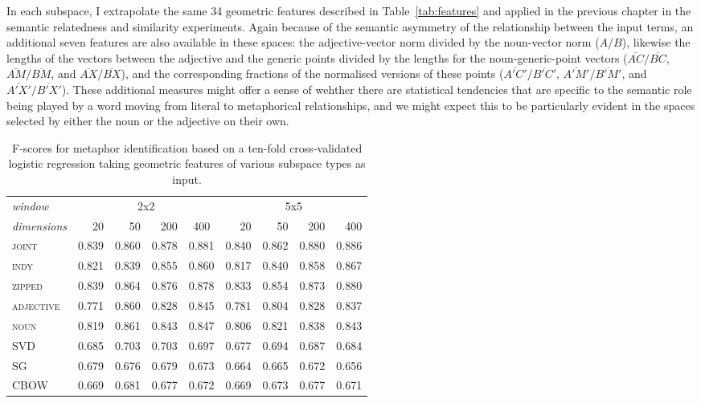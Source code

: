 In each subspace, I extrapolate the same 34 geometric features described in Table~\ref{tab:features} and applied in the previous chapter in the semantic relatedness and similarity experiments.  Again because of the semantic asymmetry of the relationship between the input terms, an additional seven features are also available in these spaces: the adjective-vector norm divided by the noun-vector norm ($A/B$), likewise the lengths of the vectors between the adjective and the generic points divided by the lengths for the noun-generic-point vectors ($\overline{AC}/\overline{BC}$, $\overline{AM}/\overline{BM}$, and $\overline{AX}/\overline{BX}$), and the corresponding fractions of the normalised versions of these points ($\overline{A'C'}/\overline{B'C'}$, $\overline{A'M'}/\overline{B'M'}$, and $\overline{A'X'}/\overline{B'X'}$).  These additional measures might offer a sense of wehther there are statistical tendencies that are specific to the semantic role being played by a word moving from literal to metaphorical relationships, and we might expect this to be particularly evident in the spaces selected by either the noun or the adjective on their own.

\begin{table}
\centering
\begin{tabular}{lrrrr|rrrr}
\hline
\emph{window} & \multicolumn{4}{c}{2x2} & \multicolumn{4}{c}{5x5} \\
\emph{dimensions} & 20 & 50 & 200 & \multicolumn{1}{c}{400} & 20 & 50 & 200 & 400 \\
\hline
\textsc{joint} & 0.839 & 0.860 & 0.878 & 0.881 & 0.840 & 0.862 & 0.880 & 0.886 \\
\textsc{indy} & 0.821 & 0.839 & 0.855 & 0.860 & 0.817 & 0.840 & 0.858 & 0.867 \\
\textsc{zipped} & 0.839 & 0.864 & 0.876 & 0.878 & 0.833 & 0.854 & 0.873 & 0.880 \\
\textsc{adjective} & 0.771 & 0.860 & 0.828 & 0.845 & 0.781 & 0.804 & 0.828 & 0.837 \\
\textsc{noun} & 0.819 & 0.861 & 0.843 & 0.847 & 0.806 & 0.821 & 0.838 & 0.843 \\
\textsc{SVD} & 0.685 & 0.703 & 0.703 & 0.697 & 0.677 & 0.694 & 0.687 & 0.684 \\
\textsc{SG} & 0.679 & 0.676 & 0.679 & 0.673 & 0.664 & 0.665 & 0.672 & 0.656 \\
\textsc{CBOW} & 0.669 & 0.681 & 0.677 & 0.672 & 0.669 & 0.673 & 0.677 & 0.671 \\
\hline
\end{tabular}
\caption[Context Sensitive and Static Model F-Scores for Metaphor Classification]{F-scores for metaphor identification based on a ten-fold cross-validated logistic regression taking geometric features of various subspace types as input.}
\label{tab:metaphor}
\end{table}

